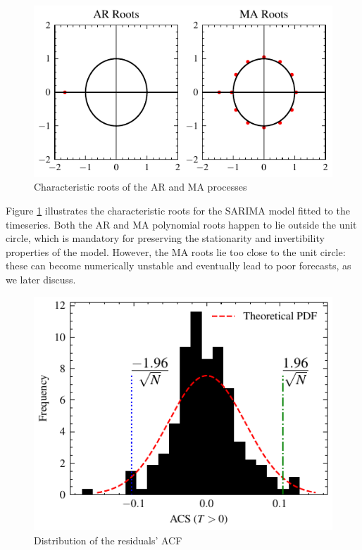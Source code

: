 \documentclass[conference]{IEEEtran}
\begin{document}
\begin{figure}[H]
    \centering
    \includegraphics{../figs/char_roots.pdf}
    \caption{Characteristic roots of the AR and MA processes}
    \label{fig:char_roots}
\end{figure}

Figure \ref{fig:char_roots} illustrates the characteristic roots for the SARIMA model fitted to the timeseries. Both the AR and MA polynomial roots happen to lie outside the unit circle, which is mandatory for preserving the stationarity and invertibility properties of the model. However, the MA roots lie too close to the unit circle: these can become numerically unstable and eventually lead to poor forecasts, as we later discuss.

\begin{figure}[H]
    \centering
    \includegraphics{../figs/dist_acf.pdf}
    \caption{Distribution of the residuals' ACF}
    \label{fig:dist_acf}
\end{figure}
\end{document}
